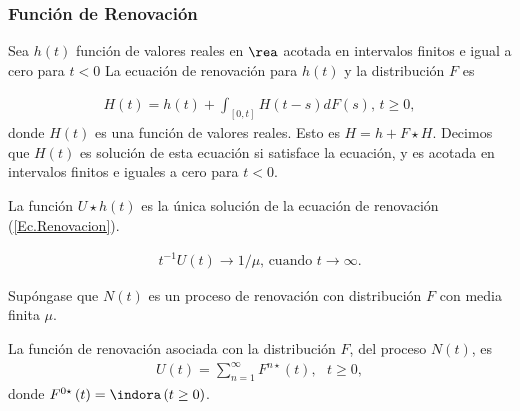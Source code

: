 %
\subsubsection{Funci\'on de Renovaci\'on}
%


\begin{Def}
Sea $h\left(t\right)$ funci\'on de valores reales en $\rea$ acotada en intervalos finitos e igual a cero para $t<0$ La ecuaci\'on de renovaci\'on para $h\left(t\right)$ y la distribuci\'on $F$ es

\begin{eqnarray}%
H\left(t\right)=h\left(t\right)+\int_{\left[0,t\right]}H\left(t-s\right)dF\left(s\right)\textrm{,    }t\geq0,
\end{eqnarray}
donde $H\left(t\right)$ es una funci\'on de valores reales. Esto es $H=h+F\star H$. Decimos que $H\left(t\right)$ es soluci\'on de esta ecuaci\'on si satisface la ecuaci\'on, y es acotada en intervalos finitos e iguales a cero para $t<0$.
\end{Def}

\begin{Prop}
La funci\'on $U\star h\left(t\right)$ es la \'unica soluci\'on de la ecuaci\'on de renovaci\'on (\ref{Ec.Renovacion}).
\end{Prop}

\begin{Teo}
\begin{eqnarray*}
t^{-1}U\left(t\right)\rightarrow 1/\mu\textrm{,    cuando }t\rightarrow\infty.
\end{eqnarray*}
\end{Teo}

%
%


Sup\'ongase que $N\left(t\right)$ es un proceso de renovaci\'on con distribuci\'on $F$ con media finita $\mu$.

\begin{Def}
La funci\'on de renovaci\'on asociada con la distribuci\'on $F$, del proceso $N\left(t\right)$, es
\begin{eqnarray*}
U\left(t\right)=\sum_{n=1}^{\infty}F^{n\star}\left(t\right),\textrm{   }t\geq0,
\end{eqnarray*}
donde $F^{0\star}\left(t\right)=\indora\left(t\geq0\right)$.
\end{Def}


